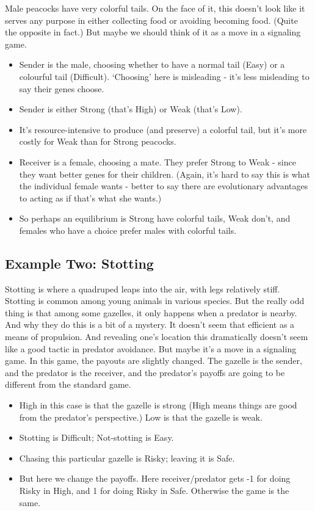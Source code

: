\documentclass[
  11pt,
]{article}
\providecommand{\tightlist}{%
  \setlength{\itemsep}{0pt}\setlength{\parskip}{0pt}}
\begin{document}
Male peacocks have very colorful tails. On the face of it, this doesn't
look like it serves any purpose in either collecting food or avoiding
becoming food. (Quite the opposite in fact.) But maybe we should think
of it as a move in a signaling game.

\begin{itemize}
\tightlist
\item
  Sender is the male, choosing whether to have a normal tail (Easy) or a
  colourful tail (Difficult). `Choosing' here is misleading - it's less
  misleading to say their genes choose.
\item
  Sender is either Strong (that's High) or Weak (that's Low).
\item
  It's resource-intensive to produce (and preserve) a colorful tail, but
  it's more costly for Weak than for Strong peacocks.
\item
  Receiver is a female, choosing a mate. They prefer Strong to Weak -
  since they want better genes for their children. (Again, it's hard to
  say this is what the individual female wants - better to say there are
  evolutionary advantages to acting as if that's what she wants.)
\item
  So perhaps an equilibrium is Strong have colorful tails, Weak don't,
  and females who have a choice prefer males with colorful tails.
\end{itemize}

\hypertarget{example-two-stotting}{%
\subsection{Example Two: Stotting}\label{example-two-stotting}}

Stotting is where a quadruped leaps into the air, with legs relatively
stiff. Stotting is common among young animals in various species. But
the really odd thing is that among some gazelles, it only happens when a
predator is nearby. And why they do this is a bit of a mystery. It
doesn't seem that efficient as a means of propulsion. And revealing
one's location this dramatically doesn't seem like a good tactic in
predator avoidance. But maybe it's a move in a signaling game. In this
game, the payouts are slightly changed. The gazelle is the sender, and
the predator is the receiver, and the predator's payoffs are going to be
different from the standard game.

\begin{itemize}
\tightlist
\item
  High in this case is that the gazelle is strong (High means things are
  good from the predator's perspective.) Low is that the gazelle is
  weak.
\item
  Stotting is Difficult; Not-stotting is Easy.
\item
  Chasing this particular gazelle is Risky; leaving it is Safe.
\item
  But here we change the payoffs. Here receiver/predator gets -1 for
  doing Risky in High, and 1 for doing Risky in Safe. Otherwise the game
  is the same.
\end{itemize}
\end{document}

